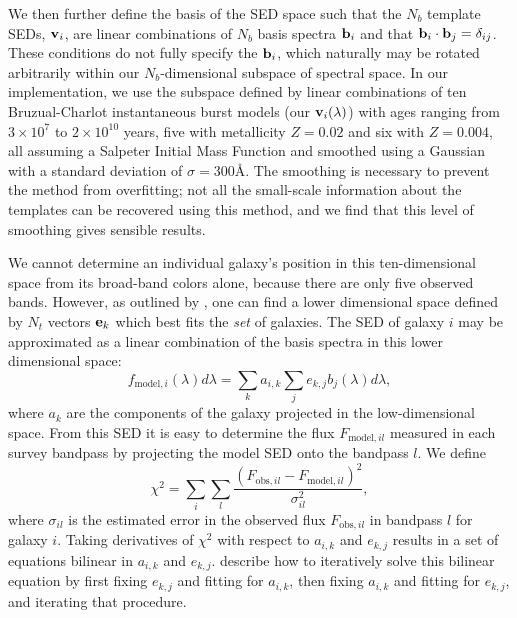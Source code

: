 \documentclass[10pt,preprint]{aastex}
\newcommand{\vv}[1]{{\bf #1}}
\begin{document}
We then further define the basis of the SED space such that the $N_b$
template SEDs, $\vv{v}_i$, are linear combinations of $N_b$ basis
spectra $\vv{b}_i$ and that $\vv{b}_i \cdot \vv{b}_j =
\delta_{ij}$. These conditions do not fully specify the $\vv{b}_i$,
which naturally may be rotated arbitrarily within our
$N_b$-dimensional subspace of spectral space.  In our implementation,
we use the subspace defined by linear combinations of ten
Bruzual-Charlot instantaneous burst models (our $\vv{v}_i(\lambda)$)
with ages ranging from $3 \times 10^7$ to $2\times 10^{10}$ years,
five with metallicity $Z=0.02$ and six with $Z=0.004$, all assuming a
Salpeter Initial Mass Function and smoothed using a Gaussian with a
standard deviation of $\sigma = 300$\AA. The smoothing is necessary
to prevent the method from overfitting; not all the small-scale
information about the templates can be recovered using this method,
and we find that this level of smoothing gives sensible results.

We cannot determine an individual galaxy's position in this
ten-dimensional space from its broad-band colors alone, because there
are only five observed bands. However, as outlined by
\citet{csabai00a}, one can find a lower dimensional space defined by
$N_t$ vectors $\vv{e}_k$ which best fits the {\it set} of
galaxies. The SED of galaxy $i$ may be approximated as a linear
combination of the basis spectra in this lower dimensional space:
\begin{equation}
\label{lincomb}
f_{\mathrm{model},i}(\lambda) d\lambda = 
\sum_k a_{i,k} \sum_j e_{k,j} b_j(\lambda) d\lambda,
\end{equation}
where $a_k$ are the components of the galaxy projected in the
low-dimensional space. From this SED it is easy to determine the flux
$F_{\mathrm{model},il}$ measured in each survey bandpass by projecting
the model SED onto the bandpass $l$. We define
\begin{equation}
\chi^2 = \sum_i \sum_l
\frac{(F_{\mathrm{obs},il}-F_{\mathrm{model},il})^2}{\sigma_{il}^2},
\end{equation}
where $\sigma_{il}$ is the estimated error in the observed flux
$F_{\mathrm{obs},il}$ in bandpass $l$ for galaxy $i$. Taking
derivatives of $\chi^2$ with respect to $a_{i,k}$ and $e_{k,j}$
results in a set of equations bilinear in $a_{i,k}$ and $e_{k,j}$.
\citet{csabai00a} describe how to iteratively solve this bilinear
equation by first fixing $e_{k,j}$ and fitting for $a_{i,k}$, then
fixing $a_{i,k}$ and fitting for $e_{k,j}$, and iterating that
procedure.
\end{document}
